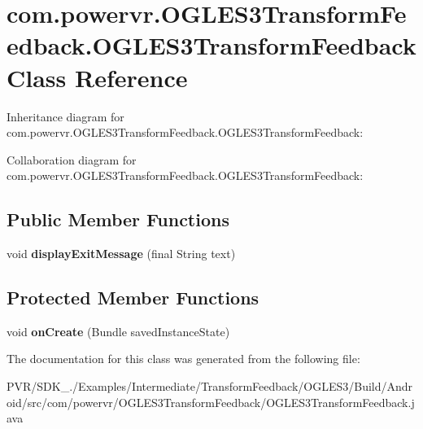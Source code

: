 \hypertarget{classcom_1_1powervr_1_1_o_g_l_e_s3_transform_feedback_1_1_o_g_l_e_s3_transform_feedback}{\section{com.\+powervr.\+O\+G\+L\+E\+S3\+Transform\+Feedback.\+O\+G\+L\+E\+S3\+Transform\+Feedback Class Reference}
\label{classcom_1_1powervr_1_1_o_g_l_e_s3_transform_feedback_1_1_o_g_l_e_s3_transform_feedback}
}


Inheritance diagram for com.\+powervr.\+O\+G\+L\+E\+S3\+Transform\+Feedback.\+O\+G\+L\+E\+S3\+Transform\+Feedback\+:


Collaboration diagram for com.\+powervr.\+O\+G\+L\+E\+S3\+Transform\+Feedback.\+O\+G\+L\+E\+S3\+Transform\+Feedback\+:
\subsection*{Public Member Functions}
\begin{DoxyCompactItemize}
\item 
\hypertarget{classcom_1_1powervr_1_1_o_g_l_e_s3_transform_feedback_1_1_o_g_l_e_s3_transform_feedback_a20cabab2768dbe9e3745ef67724d936e}{void {\bfseries display\+Exit\+Message} (final String text)}\label{classcom_1_1powervr_1_1_o_g_l_e_s3_transform_feedback_1_1_o_g_l_e_s3_transform_feedback_a20cabab2768dbe9e3745ef67724d936e}

\end{DoxyCompactItemize}
\subsection*{Protected Member Functions}
\begin{DoxyCompactItemize}
\item 
\hypertarget{classcom_1_1powervr_1_1_o_g_l_e_s3_transform_feedback_1_1_o_g_l_e_s3_transform_feedback_a12d7ee24e0eb5f6c274524f853944628}{void {\bfseries on\+Create} (Bundle saved\+Instance\+State)}\label{classcom_1_1powervr_1_1_o_g_l_e_s3_transform_feedback_1_1_o_g_l_e_s3_transform_feedback_a12d7ee24e0eb5f6c274524f853944628}

\end{DoxyCompactItemize}


The documentation for this class was generated from the following file\+:\begin{DoxyCompactItemize}
\item 
P\+V\+R/\+S\+D\+K\+\_./\+Examples/\+Intermediate/\+Transform\+Feedback/\+O\+G\+L\+E\+S3/\+Build/\+Android/src/com/powervr/\+O\+G\+L\+E\+S3\+Transform\+Feedback/O\+G\+L\+E\+S3\+Transform\+Feedback.\+java\end{DoxyCompactItemize}
